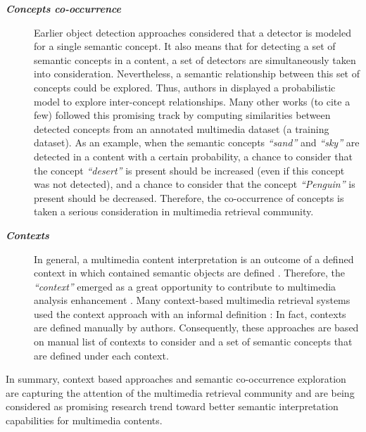 	\begin{description}
		\item[\textit{\textbf{Concepts co-occurrence}}] Earlier object detection approaches considered that a 
		detector is modeled for a single semantic concept. It also means that for detecting a set of semantic 
		concepts in a content, a set of detectors are simultaneously taken into consideration. Nevertheless, 
		a semantic relationship between this set of concepts could be explored. 
		Thus, authors in  \citep{Naphide2001} displayed a probabilistic model to explore inter-concept 
		relationships. Many other works \citep{Feng2012, Zheng2013} (to cite a few) followed 
		this promising track by computing similarities between detected concepts from an annotated multimedia 
		dataset (a training dataset). As an example, when the semantic concepts \emph{``sand''} and \emph{``sky''} 
		are detected in a content with a certain probability, a chance to consider that the concept \emph{``desert''} 
		is present should be increased (even if this concept was not detected), and a chance to consider that the 
		concept \emph{``Penguin''} is present should be decreased. Therefore, the co-occurrence of concepts is taken 
		a serious consideration in multimedia retrieval community.

		\item[\textit{\textbf{Contexts}}] In general, a multimedia content interpretation is an outcome of a defined 
		context in which contained semantic objects are defined \citep{Dumitrescu2009}. Therefore, the \emph{``context''} 
		emerged as a great opportunity to contribute to multimedia analysis enhancement 
		\citep{Elgesem2007,Jiang2009,Hori2003,Fauzi2014,Zhang2014,Schoeffmann2015}. 
		Many context-based multimedia retrieval systems used the context approach with an informal definition 
		\citep{Cioara2009, Nguyen2010, Parsons2009,PerpetualCoutinho2012,Hamadi2014}: In fact, contexts are defined 
		manually by authors. Consequently, these approaches are based on manual list of contexts to consider and 
		a set of semantic concepts that are defined under each context.
	\end{description}

	In summary, context based approaches and semantic co-occurrence exploration are capturing the attention of the 
	multimedia retrieval community and are being considered as promising research trend toward better semantic 
	interpretation capabilities for multimedia contents. 
	
